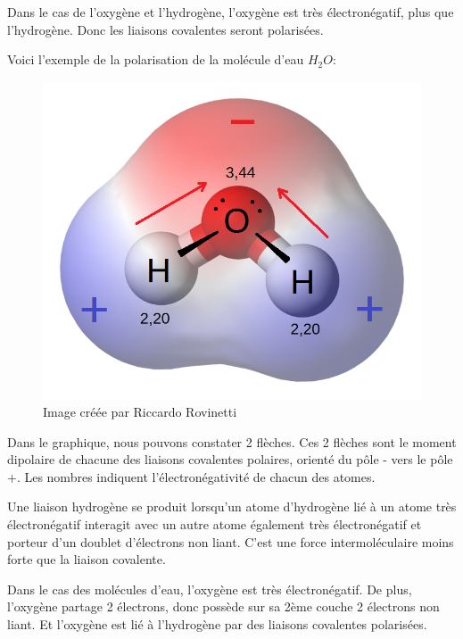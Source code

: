 \documentclass[
]{report}
\begin{document}
Dans le cas de l'oxygène et l'hydrogène, l'oxygène est très
électronégatif, plus que l'hydrogène. Donc les liaisons covalentes
seront polarisées.

Voici l'exemple de la polarisation de la molécule d'eau \(H_{2}O\):

\begin{figure}[H]

{\centering \includegraphics{./images/physique/dipole.png}

}

\caption{Image créée par Riccardo Rovinetti}

\end{figure}%

Dans le graphique, nous pouvons constater 2 flèches. Ces 2 flèches sont
le moment dipolaire de chacune des liaisons covalentes polaires, orienté
du pôle - vers le pôle +. Les nombres indiquent l'électronégativité de
chacun des atomes.

Une liaison hydrogène se produit lorsqu'un atome d'hydrogène lié à un
atome très électronégatif interagit avec un autre atome également très
électronégatif et porteur d'un doublet d'électrons non liant. C'est une
force intermoléculaire moins forte que la liaison covalente.

Dans le cas des molécules d'eau, l'oxygène est très électronégatif. De
plus, l'oxygène partage 2 électrons, donc possède sur sa 2ème couche 2
électrons non liant. Et l'oxygène est lié à l'hydrogène par des liaisons
covalentes polarisées.
\end{document}
